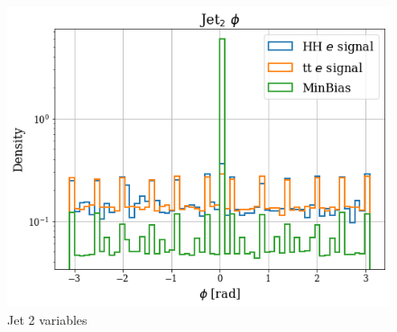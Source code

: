 \documentclass[../main.tex]{subfiles}
\begin{document}
\begin{figure}[!ht]
\begin{minipage}[b]{0.33\linewidth}
    \centering
    \includegraphics[width=1\linewidth]{Chapters/Plots/Hist_1ele_jet2_Phi.png}
  \end{minipage}
  \caption{Jet 2 variables}
\end{figure}
\end{document}
